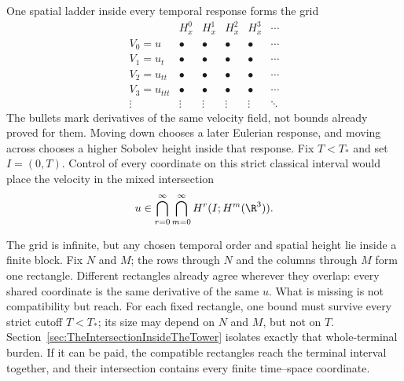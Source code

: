 One spatial ladder inside every temporal response forms the grid
{\small
\[
\begin{array}{c|ccccc}
 & H^0_x & H^1_x & H^2_x & H^3_x & \cdots\\
\hline
V_0=u      & \bullet & \bullet & \bullet & \bullet & \cdots\\
V_1=u_t    & \bullet & \bullet & \bullet & \bullet & \cdots\\
V_2=u_{tt} & \bullet & \bullet & \bullet & \bullet & \cdots\\
V_3=u_{ttt}& \bullet & \bullet & \bullet & \bullet & \cdots\\
\vdots     & \vdots  & \vdots  & \vdots  & \vdots  & \ddots
\end{array}
\]
}
The bullets mark derivatives of the same velocity field, not bounds already proved for them.
Moving down chooses a later Eulerian response, and moving across chooses a higher Sobolev height inside that response.
Fix \(T<T_*\) and set \(I=(0,T)\).
Control of every coordinate on this strict classical interval would place the velocity in the mixed intersection
\begin{equation}\label{eq:BodyDesiredMixedIntersection}
  u\in
  \bigcap_{r=0}^{\infty}
  \bigcap_{m=0}^{\infty}
  H^r(I;H^m(\R^3)).
\end{equation}

The grid is infinite, but any chosen temporal order and spatial height lie inside a finite block.
Fix \(N\) and \(M\); the rows through \(N\) and the columns through \(M\) form one rectangle.
Different rectangles already agree wherever they overlap: every shared coordinate is the same derivative of the same \(u\).
What is missing is not compatibility but reach.
For each fixed rectangle, one bound must survive every strict cutoff \(T<T_*\); its size may depend on \(N\) and \(M\), but not on \(T\).
Section~\ref{sec:TheIntersectionInsideTheTower} isolates exactly that whole-terminal burden.
If it can be paid, the compatible rectangles reach the terminal interval together, and their intersection contains every finite time--space coordinate.
